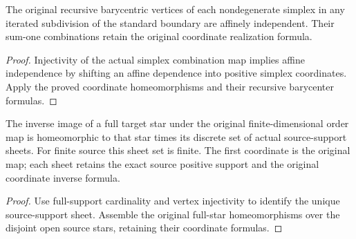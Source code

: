 \begin{proposition}
  \label{prop:actual-subdivision-vertex-affine-independence}
  \leanok
  The original recursive barycentric vertices of each nondegenerate simplex in any iterated subdivision of the standard boundary are affinely independent. Their sum-one combinations retain the original coordinate realization formula.
\end{proposition}
\begin{proof}
  Injectivity of the actual simplex combination map implies affine independence by shifting an affine dependence into positive simplex coordinates. Apply the proved coordinate homeomorphisms and their recursive barycenter formulas.
  \leanok
\end{proof}

\begin{proposition}
  \label{prop:actual-full-star-sheets}
  \leanok
  The inverse image of a full target star under the original finite-dimensional order map is homeomorphic to that star times its discrete set of actual source-support sheets. For finite source this sheet set is finite. The first coordinate is the original map; each sheet retains the exact source positive support and the original coordinate inverse formula.
\end{proposition}
\begin{proof}
  Use full-support cardinality and vertex injectivity to identify the unique source-support sheet. Assemble the original full-star homeomorphisms over the disjoint open source stars, retaining their coordinate formulas.
  \leanok
\end{proof}

